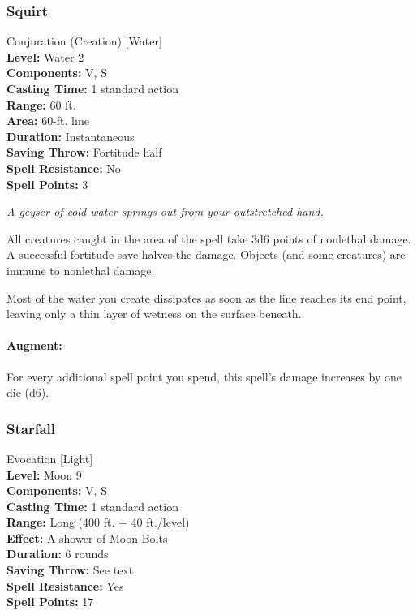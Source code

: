 \subsubsection{Squirt}
\label{Spell:Squirt}
Conjuration (Creation) [Water]
\\ \textbf{Level:} Water 2
\\ \textbf{Components:} V, S
\\ \textbf{Casting Time:} 1 standard action
\\ \textbf{Range:} 60 ft.
\\ \textbf{Area:} 60-ft. line
\\ \textbf{Duration:} Instantaneous
\\ \textbf{Saving Throw:} Fortitude half
\\ \textbf{Spell Resistance:} No
\\ \textbf{Spell Points:} 3

\emph{A geyser of cold water springs out from your outstretched hand.}

All creatures caught in the area of the spell take 3d6 points of nonlethal damage.
A successful fortitude save halves the damage.
Objects (and some creatures) are immune to nonlethal damage.

Most of the water you create dissipates as soon as the line reaches its end point, leaving only a thin layer of wetness on the surface beneath.

\paragraph{Augment:} For every additional spell point you spend, this spell's damage increases by one die (d6).
\subsubsection{Starfall}
\label{Spell:Starfall}
Evocation [Light]
\\ \textbf{Level:} Moon 9
\\ \textbf{Components:} V, S
\\ \textbf{Casting Time:} 1 standard action
\\ \textbf{Range:} Long (400 ft. + 40 ft./level)
\\ \textbf{Effect:} A shower of Moon Bolts
\\ \textbf{Duration:} 6 rounds
\\ \textbf{Saving Throw:} See text
\\ \textbf{Spell Resistance:} Yes
\\ \textbf{Spell Points:} 17

